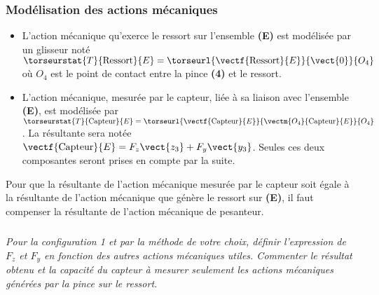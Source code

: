 \subsubsection*{Modélisation des actions mécaniques}
\begin{itemize}
\item L'action mécanique qu’exerce le ressort sur l’ensemble \textbf{(E)} est modélisée par un glisseur noté $\torseurstat{T}{\text{Ressort}}{E}=\torseurl{\vectf{\text{Ressort}}{E}}{\vect{0}}{O_4}$ où $O_4$ est le point de contact entre la pince \textbf{(4)} et le ressort.
\item L'action mécanique, mesurée par le capteur, liée à sa liaison avec l'ensemble
\textbf{(E)}, est modélisée par
$\torseurstat{T}{\text{Capteur}}{E}=\torseurl{\vectf{\text{Capteur}}{E}}{\vectm{O_4}{\text{Capteur}}{E}}{O_4}$. La résultante sera notée $\vectf{\text{Capteur}}{E}=F_z\vect{z_3}+F_y\vect{y_3}$. Seules ces deux composantes seront prises en compte par la suite. 
\end{itemize}

Pour que la résultante de l’action mécanique mesurée par le capteur soit égale à la résultante de l’action mécanique que génère le ressort sur \textbf{(E)}, il faut
compenser la résultante de l’action mécanique de pesanteur.

\fi

\subparagraph{}
\textit{Pour la configuration 1 et par la méthode de votre choix, définir l’expression de $F_z$ et $F_y$ en fonction des autres actions mécaniques utiles. Commenter le résultat obtenu et la capacité du capteur à mesurer seulement les actions mécaniques générées par la pince sur le ressort.}

